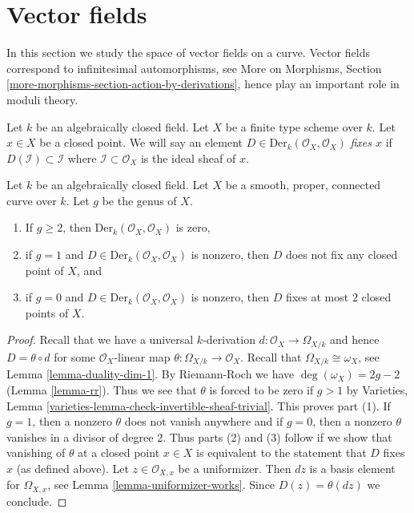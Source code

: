 \section{Vector fields}
\label{section-vector-fields}

\noindent
In this section we study the space of vector fields on a curve.
Vector fields correspond to infinitesimal automorphisms, see
More on Morphisms, Section \ref{more-morphisms-section-action-by-derivations},
hence play an important role in moduli theory.

\medskip\noindent
Let $k$ be an algebraically closed field.
Let $X$ be a finite type scheme over $k$.
Let $x \in X$ be a closed point.
We will say an element $D \in \text{Der}_k(\mathcal{O}_X, \mathcal{O}_X)$
{\it fixes $x$} if $D(\mathcal{I}) \subset \mathcal{I}$ where
$\mathcal{I} \subset \mathcal{O}_X$ is the ideal sheaf of $x$.

\begin{lemma}
\label{lemma-smooth-vector-fields}
Let $k$ be an algebraically closed field.
Let $X$ be a smooth, proper, connected curve over $k$.
Let $g$ be the genus of $X$.
\begin{enumerate}
\item If $g \geq 2$, then $\text{Der}_k(\mathcal{O}_X, \mathcal{O}_X)$
is zero,
\item if $g = 1$ and $D \in \text{Der}_k(\mathcal{O}_X, \mathcal{O}_X)$
is nonzero, then $D$ does not fix any closed point of $X$, and
\item if $g = 0$ and $D \in \text{Der}_k(\mathcal{O}_X, \mathcal{O}_X)$
is nonzero, then $D$ fixes at most $2$ closed points of $X$.
\end{enumerate}
\end{lemma}

\begin{proof}
Recall that we have a universal $k$-derivation
$d : \mathcal{O}_X \to \Omega_{X/k}$ and hence $D = \theta \circ d$
for some $\mathcal{O}_X$-linear map $\theta : \Omega_{X/k} \to \mathcal{O}_X$.
Recall that $\Omega_{X/k} \cong \omega_X$, see
Lemma \ref{lemma-duality-dim-1}.
By Riemann-Roch we have $\deg(\omega_X) = 2g - 2$
(Lemma \ref{lemma-rr}).
Thus we see that $\theta$ is forced to be zero
if $g > 1$ by Varieties, Lemma
\ref{varieties-lemma-check-invertible-sheaf-trivial}.
This proves part (1).
If $g = 1$, then a nonzero $\theta$ does not vanish anywhere and if
$g = 0$, then a nonzero $\theta$ vanishes in a divisor of degree $2$.
Thus parts (2) and (3) follow if we show that
vanishing of $\theta$ at a closed point $x \in X$ is
equivalent to the statement that $D$ fixes $x$ (as defined above).
Let $z \in \mathcal{O}_{X, x}$ be a uniformizer.
Then $dz$ is a basis element for $\Omega_{X, x}$, see
Lemma \ref{lemma-uniformizer-works}.
Since $D(z) = \theta(dz)$ we conclude.
\end{proof}

